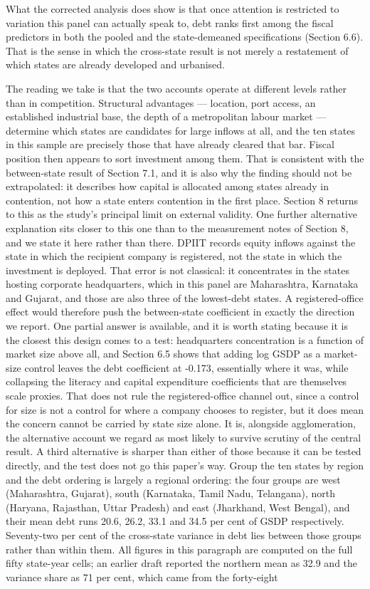 \documentclass[12pt,a4paper]{article}
\begin{document}
What the corrected analysis does show is that once attention is restricted to variation this panel can actually speak to, debt ranks first among the fiscal predictors in both the pooled and the state-demeaned specifications (Section 6.6). That is the sense in which the cross-state result is not merely a restatement of which states are already developed and urbanised.

The reading we take is that the two accounts operate at different levels rather than in competition. Structural advantages --- location, port access, an established industrial base, the depth of a metropolitan labour market --- determine which states are candidates for large inflows at all, and the ten states in this sample are precisely those that have already cleared that bar. Fiscal position then appears to sort investment among them. That is consistent with the between-state result of Section 7.1, and it is also why the finding should not be extrapolated: it describes how capital is allocated among states already in contention, not how a state enters contention in the first place. Section 8 returns to this as the study's principal limit on external validity. One further alternative explanation sits closer to this one than to the measurement notes of Section 8, and we state it here rather than there. DPIIT records equity inflows against the state in which the recipient company is registered, not the state in which the investment is deployed. That error is not classical: it concentrates in the states hosting corporate headquarters, which in this panel are Maharashtra, Karnataka and Gujarat, and those are also three of the lowest-debt states. A registered-office effect would therefore push the between-state coefficient in exactly the direction we report. One partial answer is available, and it is worth stating because it is the closest this design comes to a test: headquarters concentration is a function of market size above all, and Section 6.5 shows that adding log GSDP as a market-size control leaves the debt coefficient at -0.173, essentially where it was, while collapsing the literacy and capital expenditure coefficients that are themselves scale proxies. That does not rule the registered-office channel out, since a control for size is not a control for where a company chooses to register, but it does mean the concern cannot be carried by state size alone. It is, alongside agglomeration, the alternative account we regard as most likely to survive scrutiny of the central result. A third alternative is sharper than either of those because it can be tested directly, and the test does not go this paper's way. Group the ten states by region and the debt ordering is largely a regional ordering: the four groups are west (Maharashtra, Gujarat), south (Karnataka, Tamil Nadu, Telangana), north (Haryana, Rajasthan, Uttar Pradesh) and east (Jharkhand, West Bengal), and their mean debt runs 20.6, 26.2, 33.1 and 34.5 per cent of GSDP respectively. Seventy-two per cent of the cross-state variance in debt lies between those groups rather than within them. All figures in this paragraph are computed on the full fifty state-year cells; an earlier draft reported the northern mean as 32.9 and the variance share as 71 per cent, which came from the forty-eight 
\end{document}
